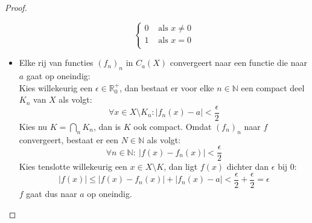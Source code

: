 \documentclass[main.tex]{subfiles}
\begin{document}
\begin{st}
\begin{proof}
\begin{itemize}
\begin{minipage}{.45\textwidth}
\[        \left\{
          \begin{array}{rl}
            0 & \text{ als } x \neq 0 \\
            1  & \text{ als } x = 0\\
          \end{array}
        \right.
        \]
      \end{minipage}
    \item Elke rij van functies $(f_{n})_{n}$ in $C_{a}(X)$ convergeert naar een functie die naar $a$ gaat op oneindig:\\
      Kies willekeurig een $\epsilon\in\mathbb{R}_{0}^{+}$, dan bestaat er voor elke $n\in\mathbb{N}$ een compact deel $K_{n}$ van $X$ als volgt:
      \[ \forall x\in X \setminus K_{n}: |f_{n}(x)-a| < \frac{\epsilon}{2} \]
      Kies nu $K = \bigcap_{n}K_{n}$, dan is $K$ ook compact.
      Omdat $(f_{n})_{n}$ naar $f$ convergeert, bestaat er een $N\in\mathbb{N}$ als volgt:
      \[ \forall n\in\mathbb{N}:\ |f(x)-f_{n}(x)| < \frac{\epsilon}{2} \]
      Kies tenslotte willekeurig een $x\in X\setminus K$, dan ligt $f(x)$ dichter dan $\epsilon$ bij $0$:
      \[ |f(x)| \le |f(x) - f_{n}(x)| + |f_{n}(x)-a| < \frac{\epsilon}{2} + \frac{\epsilon}{2} = \epsilon \]
      $f$ gaat dus naar $a$ op oneindig.
    \end{itemize}
  \end{proof}
\end{st}
\end{document}
